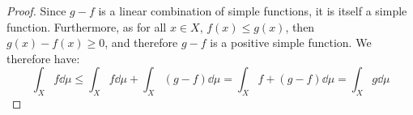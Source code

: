 \documentclass{article}
\newtheorem{theorem}{Theorem}[section]
\theoremstyle{definition}
\theoremstyle{remark}
\theoremstyle{example}
\theoremstyle{notation}
\begin{document}
\begin{proof}
		Since $g - f$ is a linear combination of simple functions, it is itself a simple function. Furthermore, as for all $x \in X$, $f(x) \leq g(x)$, then $g(x) - f(x) \geq 0$, and therefore $g - f$ is a positive simple function. We therefore have:
				$$\int_X f \dd \mu \leq \int_X f \dd \mu + \int_X (g - f) \dd \mu = \int_X f + (g - f) \dd \mu = \int_X g \dd \mu$$
\end{proof}


		

\end{document}
